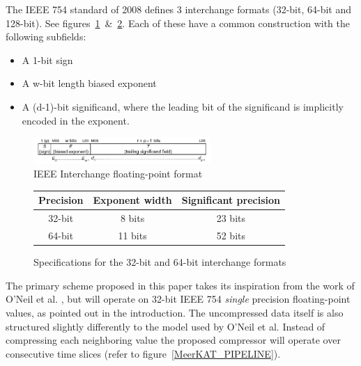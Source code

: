 The IEEE 754 standard of 2008 defines 3 interchange formats (32-bit, 64-bit and 128-bit). See figures~\ref{IEEE_FLOAT}~\&~\ref{IEEE_FLOAT_TAB}. Each of these have a common 
construction with the following subfields:
\begin{itemize}
 \item A 1-bit sign
 \item A w-bit length biased exponent
 \item A (d-1)-bit significand, where the leading bit of the significand is implicitly encoded in the exponent.
\end{itemize}
\begin{figure}[h!]
  \begin{mdframed}
  \centering
  \includegraphics[width=0.6\textwidth]{IEEEinterchangeFormat.png}
  \caption{IEEE Interchange floating-point format \cite{4610935}}
  \label{IEEE_FLOAT}
  \end{mdframed}
\end{figure}
\begin{figure}[h!]
\begin{mdframed}
\centering
\begin{tabular}{|c|c|c|}
 \hline
 Precision & Exponent width & Significant precision \\
 \hline
 32-bit & 8 bits & 23 bits \\
 \hline
 64-bit & 11 bits & 52 bits \\
 \hline
\end{tabular}
\caption{Specifications for the 32-bit and 64-bit interchange formats}
 \label{IEEE_FLOAT_TAB}
\end{mdframed}
\end{figure}
The primary scheme proposed in this paper takes its inspiration from the work of O'Neil et al. \cite{O'Neil:2011:FDC:1964179.1964189}, but will operate on 32-bit 
IEEE 754 \textit{single} precision floating-point values, as pointed out in the introduction. The uncompressed data itself is also structured slightly 
differently to the model used by O'Neil et al. Instead of compressing each neighboring value the proposed compressor will operate 
over consecutive time slices (refer to figure~\ref{MeerKAT_PIPELINE}).

